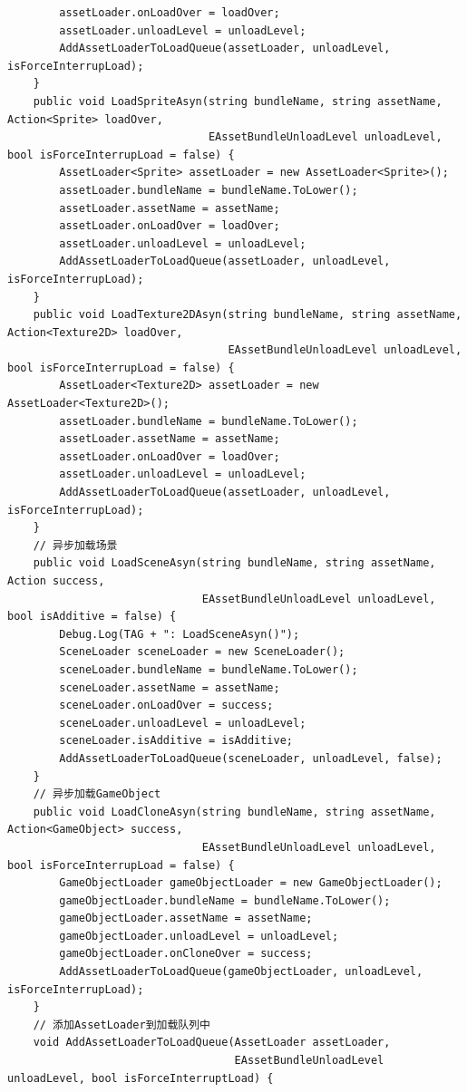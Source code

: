 \documentclass[9pt, b5paper]{article}
\begin{document}
\begin{verbatim}
        assetLoader.onLoadOver = loadOver;
        assetLoader.unloadLevel = unloadLevel;
        AddAssetLoaderToLoadQueue(assetLoader, unloadLevel, isForceInterrupLoad);
    }
    public void LoadSpriteAsyn(string bundleName, string assetName, Action<Sprite> loadOver, 
                               EAssetBundleUnloadLevel unloadLevel, bool isForceInterrupLoad = false) {
        AssetLoader<Sprite> assetLoader = new AssetLoader<Sprite>();
        assetLoader.bundleName = bundleName.ToLower();
        assetLoader.assetName = assetName;
        assetLoader.onLoadOver = loadOver;
        assetLoader.unloadLevel = unloadLevel;
        AddAssetLoaderToLoadQueue(assetLoader, unloadLevel, isForceInterrupLoad);
    }
    public void LoadTexture2DAsyn(string bundleName, string assetName, Action<Texture2D> loadOver, 
                                  EAssetBundleUnloadLevel unloadLevel, bool isForceInterrupLoad = false) {
        AssetLoader<Texture2D> assetLoader = new AssetLoader<Texture2D>();
        assetLoader.bundleName = bundleName.ToLower();
        assetLoader.assetName = assetName;
        assetLoader.onLoadOver = loadOver;
        assetLoader.unloadLevel = unloadLevel;
        AddAssetLoaderToLoadQueue(assetLoader, unloadLevel, isForceInterrupLoad);
    }
    // 异步加载场景
    public void LoadSceneAsyn(string bundleName, string assetName, Action success, 
                              EAssetBundleUnloadLevel unloadLevel, bool isAdditive = false) {
        Debug.Log(TAG + ": LoadSceneAsyn()"); 
        SceneLoader sceneLoader = new SceneLoader();
        sceneLoader.bundleName = bundleName.ToLower();
        sceneLoader.assetName = assetName;
        sceneLoader.onLoadOver = success;
        sceneLoader.unloadLevel = unloadLevel;
        sceneLoader.isAdditive = isAdditive;
        AddAssetLoaderToLoadQueue(sceneLoader, unloadLevel, false);
    }
    // 异步加载GameObject
    public void LoadCloneAsyn(string bundleName, string assetName, Action<GameObject> success, 
                              EAssetBundleUnloadLevel unloadLevel, bool isForceInterrupLoad = false) {
        GameObjectLoader gameObjectLoader = new GameObjectLoader();
        gameObjectLoader.bundleName = bundleName.ToLower();
        gameObjectLoader.assetName = assetName;
        gameObjectLoader.unloadLevel = unloadLevel;
        gameObjectLoader.onCloneOver = success;
        AddAssetLoaderToLoadQueue(gameObjectLoader, unloadLevel, isForceInterrupLoad);
    }
    // 添加AssetLoader到加载队列中
    void AddAssetLoaderToLoadQueue(AssetLoader assetLoader, 
                                   EAssetBundleUnloadLevel unloadLevel, bool isForceInterruptLoad) {

\end{verbatim}
\end{document}
